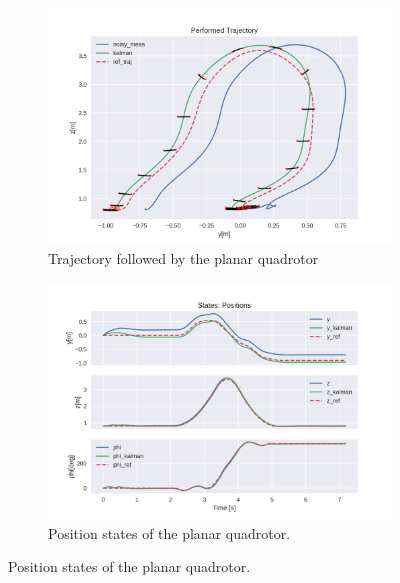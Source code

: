 \documentclass{thesisreport}
\begin{document}
\begin{figure}[H]
	\begin{subfigure}{0.48\textwidth}
		\includegraphics[width=\linewidth]{Images/acados_simulations/flip_trajectory/planar_quadrotor/noisy/sim.png}
		\caption{Trajectory followed by the planar quadrotor} \label{fig:flip_planar_sim_2d_noisy}
	\end{subfigure}\hspace*{\fill}
	\begin{subfigure}{0.48\textwidth}
		\includegraphics[width=\linewidth]{Images/acados_simulations/flip_trajectory/planar_quadrotor/noisy/posStates.png}
		\caption{Position states of the planar quadrotor.} \label{fig:flip_planar_sim_pose_noisy}
	\end{subfigure}


\end{figure}
\end{document}
